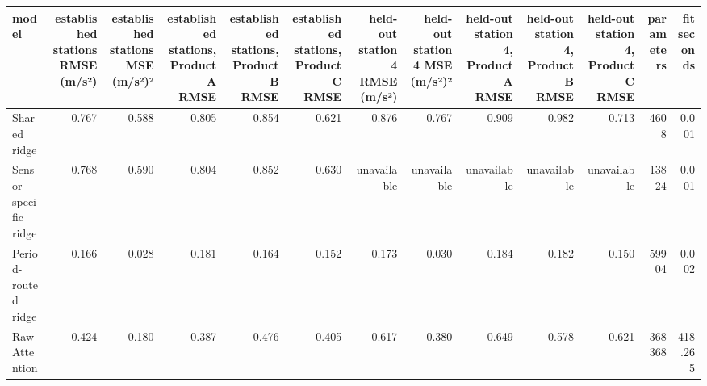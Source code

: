 \begin{tabular}{lrrrrrrrrrrrr}
\toprule
model & established stations RMSE (m/s²) & established stations MSE (m/s²)² & established stations, Product A RMSE & established stations, Product B RMSE & established stations, Product C RMSE & held-out station 4 RMSE (m/s²) & held-out station 4 MSE (m/s²)² & held-out station 4, Product A RMSE & held-out station 4, Product B RMSE & held-out station 4, Product C RMSE & parameters & fit seconds \\
\midrule
Shared ridge & 0.767 & 0.588 & 0.805 & 0.854 & 0.621 & 0.876 & 0.767 & 0.909 & 0.982 & 0.713 & 4608 & 0.001 \\
Sensor-specific ridge & 0.768 & 0.590 & 0.804 & 0.852 & 0.630 & unavailable & unavailable & unavailable & unavailable & unavailable & 13824 & 0.001 \\
Period-routed ridge & 0.166 & 0.028 & 0.181 & 0.164 & 0.152 & 0.173 & 0.030 & 0.184 & 0.182 & 0.150 & 59904 & 0.002 \\
Raw Attention & 0.424 & 0.180 & 0.387 & 0.476 & 0.405 & 0.617 & 0.380 & 0.649 & 0.578 & 0.621 & 368368 & 418.265 \\
\bottomrule
\end{tabular}
